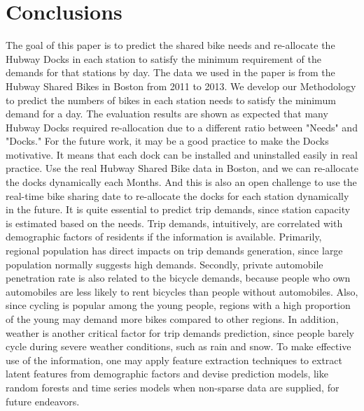 \documentclass[journal, letterpaper]{IEEEtran}
\begin{document}
\section{Conclusions}
\large
The goal of this paper is to predict the shared bike needs and re-allocate the Hubway Docks in each station to satisfy the minimum requirement of the demands for that stations by day. The data we used in the paper is from the Hubway Shared Bikes in Boston from 2011 to 2013.  We develop our Methodology to predict the numbers of bikes in each station needs to satisfy the minimum demand for a day. The evaluation results are shown as expected that many Hubway Docks required re-allocation due to a different ratio between "Needs" and "Docks." For the future work, it may be a good practice to make the Docks motivative. It means that each dock can be installed and uninstalled easily in real practice. Use the real Hubway Shared Bike data in Boston, and we can re-allocate the docks dynamically each Months. And this is also an open challenge to use the real-time bike sharing date to re-allocate the docks for each station dynamically in the future. It is quite essential to predict trip demands, since station capacity is estimated based on the needs. Trip demands, intuitively, are correlated with demographic factors of residents if the information is available. Primarily, regional population has direct impacts on trip demands generation, since large population normally suggests high demands. Secondly, private automobile penetration rate is also related to the bicycle demands, because people who own automobiles are less likely to rent bicycles than people without automobiles. Also, since cycling is popular among the young people, regions with a high proportion of the young may demand more bikes compared to other regions. In addition, weather is another critical factor for trip demands prediction, since people barely cycle during severe weather conditions, such as rain and snow. To make effective use of the information, one may apply feature extraction techniques to extract latent features from demographic factors and devise prediction models, like random forests and time series models when non-sparse data are supplied, for future endeavors. 
\end{document}
